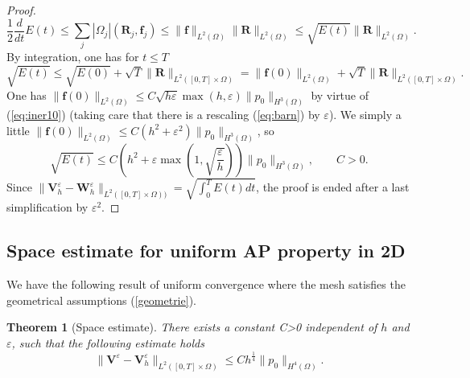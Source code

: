 \documentclass[a4paper,french,english,10pt]{article}
\newcommand\eps{\varepsilon}
\newcommand\fj{\mathbf{f}_j}
\newcommand\V{\mathbf{V}}
\newtheorem{theorem}{Theorem}[section]
\begin{document}
\begin{proof}
\begin{equation*}
\frac12 \frac{d}{dt}
E(t) \leq \sum_j
| \Omega_j | 
(\mathbf{R}_j,\fj ) \leq \|\mathbf f\|_{L^2(\Omega)}  \| \mathbf R\|
_{L^2(\Omega)} \leq \sqrt{E(t)}
\| \mathbf R\|
_{L^2(\Omega)} .
\end{equation*}
By integration,  one has for $t\leq T$ 
$$
\sqrt{  E(t)}\leq \sqrt{E(0)}+
\sqrt T \|\mathbf  R\|_{L^2([0,T]\times \Omega)}
=
\| \mathbf f (0)\|_{L^2(\Omega)  } +\sqrt T
\|\mathbf  R\|_{L^2([0,T]\times \Omega)}.
$$
One has 
 $\|\mathbf f(0)\|_{L^2(\Omega)  }\leq C \sqrt{h\eps}\max(h,\eps)   \|  p_0  \|_{H^3(\Omega)} $
by virtue of (\ref{eq:iner10}) (taking care that there is a rescaling (\ref{eq:barn})
by  $\eps$).
We simply a little 
$\|\mathbf f(0)\|_{L^2(\Omega)  }\leq C
\left(h^2+\eps^2   \right)\|  p_0  \|_{H^3(\Omega)}$, so
$$
\sqrt{  E(t)}\leq C\left(  h^2 + \eps \max\left(1, \sqrt{\frac\eps h}  \right)  \right) \|  p_0  \|_{H^3(\Omega)} , \qquad C>0.
$$
Since
$
\|\V_h^{\eps}-\mathbf W_h^\eps\|_{L^2([0,T] \times \Omega))} =\sqrt{\int_0^TE(t)dt}
$, 
the proof is ended after a last simplification by $\varepsilon^2$.
\end{proof}
\subsection{Space estimate for  uniform AP property in 2D}

We have the following
result of uniform convergence where the mesh satisfies the geometrical assumptions
(\ref{geometrie}).

\begin{theorem} [Space estimate]\label{theor:main}
  There exists a constant
C>0 independent of $h$ and $\eps$, such that the following estimate holds
\begin{equation*}\label{est2}
\|\V^{\eps}-\V^{\eps}_h\|_{L^2([0,T]\times\Omega)}\leq
C h^{\frac{1}{4}} \|    p_0  \| _{H^4(\Omega)}.
\end{equation*}
\end{theorem}
\end{document}
